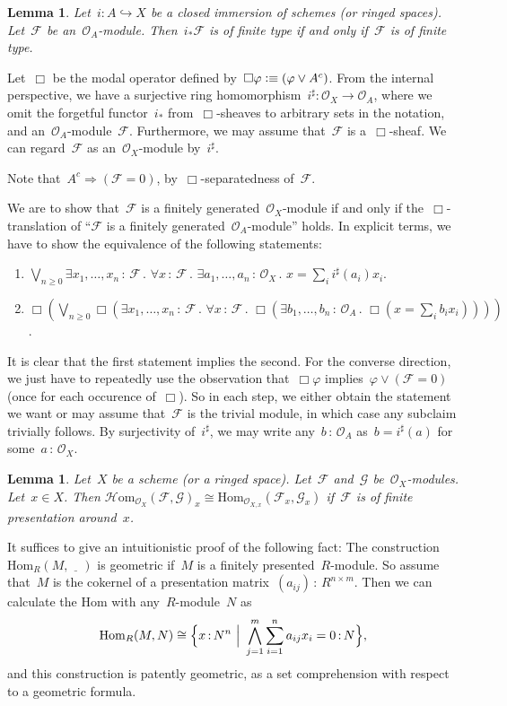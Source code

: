 \documentclass[10pt,reqno,a4paper]{amsbook}
\makeatletter
\theoremstyle{definition}
\theoremstyle{plain}
\newtheorem{lemma}[defn]{Lemma}
\theoremstyle{remark}
\newcommand{\F}{\mathcal{F}}
\renewcommand{\G}{\mathcal{G}}
\renewcommand{\O}{\mathcal{O}}
\newcommand{\Hom}{\mathrm{Hom}}
\newcommand{\HOM}{\mathcal{H}\mathrm{om}}
\newcommand{\placeholder}{\underline{\quad}}
\newcommand{\?}{\,{:}\,}
\renewcommand{\_}{\mathpunct{.}\,}
\newcommand{\defequiv}{\vcentcolon\equiv}
\renewenvironment{proof}[1][\proofname]{\par
  \pushQED{\qed}%
  \normalfont \topsep6\p@\@plus6\p@\relax
  \trivlist
  \item[\hskip\labelsep
        \itshape
    #1\@addpunct{.}]\ignorespaces
}{%
  \popQED\endtrivlist\@endpefalse
}
\makeatother
\begin{document}
\begin{lemma}\label{lemma:pushforward-finite-type}
Let~$i : A \hookrightarrow X$ be a closed immersion of schemes (or
ringed spaces). Let~$\F$ be an~$\O_A$-module. Then~$i_*\F$ is of finite type if
and only if~$\F$ is of finite type.\end{lemma}
\begin{proof}
Let~$\Box$ be the modal operator defined by~$\Box\varphi \defequiv (\varphi \vee
A^c)$. From the internal perspective, we have a surjective ring homomorphism~$i^\sharp
: \O_X \to \O_A$, where we omit the forgetful functor~$i_*$ from~$\Box$-sheaves
to arbitrary sets in the notation, and an~$\O_A$-module~$\F$. Furthermore, we
may assume that~$\F$ is a~$\Box$-sheaf. We can regard~$\F$ as an~$\O_X$-module
by~$i^\sharp$.

Note that~$A^c \Rightarrow (\F = 0)$, by~$\Box$-separatedness of~$\F$.

We are to show that~$\F$ is a finitely generated~$\O_X$-module if and only if
the~$\Box$-translation of ``$\F$ is a finitely generated~$\O_A$-module'' holds.
In explicit terms, we have to show the equivalence of the following statements:
\begin{enumerate}
\item $\bigvee_{n \geq 0} \exists x_1,\ldots,x_n\?\F\_
  \forall x\?\F\_ \exists a_1,\ldots,a_n\?\O_X\_ x = \sum_i i^\sharp(a_i) x_i$.
\item $\Box(\bigvee_{n \geq 0} \Box(\exists x_1,\ldots,x_n\?\F\_
  \forall x\?\F\_ \Box(\exists b_1,\ldots,b_n\?\O_A\_ \Box(
    x = \sum_i b_i x_i))))$.
\end{enumerate}
It is clear that the first statement implies the second. For the converse
direction, we just have to repeatedly use the observation that~$\Box\varphi$
implies~$\varphi \vee (\F = 0)$ (once for each occurence of~$\Box$). So in each
step, we either obtain the statement we want or may assume
that~$\F$ is the trivial module, in which case any subclaim trivially follows. By
surjectivity of~$i^\sharp$, we may write any~$b\?\O_A$ as~$b =
i^\sharp(a)$ for some~$a\?\O_X$.
\end{proof}

\begin{lemma}\label{lemma:fp-hom-geometric}
Let~$X$ be a scheme (or a ringed space). Let~$\F$ and~$\G$ be~$\O_X$-modules. Let~$x
\in X$. Then $\HOM_{\O_X}(\F,\G)_x \cong \Hom_{\O_{X,x}}(\F_x,\G_x)$ if~$\F$ is
of finite presentation around~$x$.\end{lemma}
\begin{proof}It suffices to give an intuitionistic proof of the following fact:
The construction~$\Hom_R(M,\placeholder)$ is geometric if~$M$ is a finitely
presented~$R$-module. So assume that~$M$ is the cokernel of a presentation
matrix~$(a_{ij}) \? R^{n \times m}$. Then we can calculate the Hom with
any~$R$-module~$N$ as
\[ \Hom_R(M,N) \cong \Bigl\{ x \? N^n \ \Big|\ \bigwedge_{j=1}^m \sum_{i=1}^n a_{ij}
x_i = 0 \? N \Bigr\}, \]
and this construction is patently geometric, as a set comprehension with respect to
a geometric formula.
\end{proof}
\end{document}
